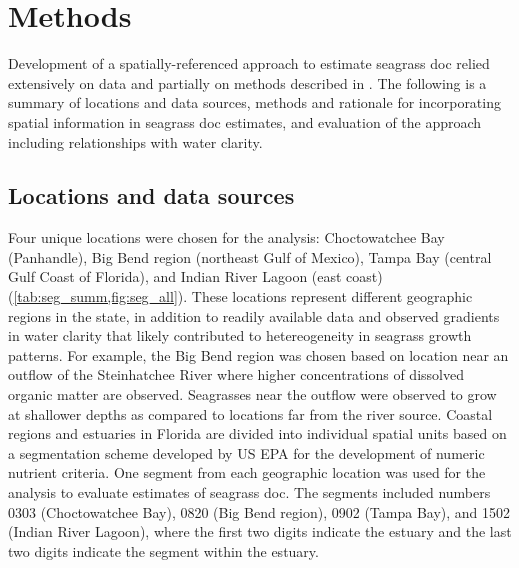 \documentclass[letterpaper,12pt,oneside]{article}\usepackage[]{graphicx}\usepackage[]{color}
\begin{document}
\section{Methods}

Development of a spatially-referenced approach to estimate seagrass \ac{doc} relied extensively on data and partially on methods described in .  The following is a summary of locations and data sources, methods and rationale for incorporating spatial information in seagrass \ac{doc} estimates, and evaluation of the approach including relationships with water clarity.   

\subsection{Locations and data sources}

Four unique locations were chosen for the analysis: Choctowatchee Bay (Panhandle), Big Bend region (northeast Gulf of Mexico), Tampa Bay (central Gulf Coast of Florida), and Indian River Lagoon (east coast) (\cref{tab:seg_summ,fig:seg_all}).  These locations represent different geographic regions in the state, in addition to readily available data and observed gradients in water clarity that likely contributed to hetereogeneity in seagrass growth patterns.  For example, the Big Bend region was chosen based on location near an outflow of the Steinhatchee River where higher concentrations of dissolved organic matter are observed.  Seagrasses near the outflow were observed to grow at shallower depths as compared to locations far from the river source.  Coastal regions and estuaries in Florida are divided into individual spatial units based on a segmentation scheme developed by US \ac{EPA} for the development of numeric nutrient criteria.  One segment from each geographic location was used for the analysis to evaluate estimates of seagrass \ac{doc}.  The segments included numbers 0303 (Choctowatchee Bay), 0820 (Big Bend region), 0902 (Tampa Bay), and 1502 (Indian River Lagoon), where the first two digits indicate the estuary and the last two digits indicate the segment within the estuary. 
\end{document}
